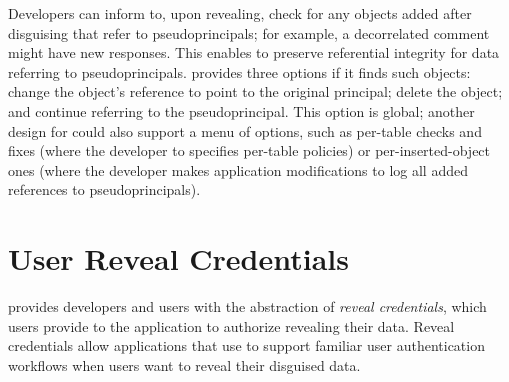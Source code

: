 Developers can inform \sys to, upon revealing, check for any objects
added after disguising that refer to pseudoprincipals; for example, a
decorrelated comment might have new responses. This enables \sys to preserve
referential integrity for data referring to pseudoprincipals. \sys
provides three options if it finds such objects: \one{} change the object's
reference to point to the original principal; \two{} delete the object; and
\three{} continue referring to the pseudoprincipal.
%
This option is global; another design for \sys could also support a menu of
options, such as per-table checks and fixes (where the developer to specifies
per-table policies) or per-inserted-object ones (where the developer makes
application modifications to log all added references to pseudoprincipals).


%
%
%
%
%
%
%
%



\section{User Reveal Credentials}
\sys provides developers and users
with the abstraction of \emph{reveal credentials}, which users provide to the
application to authorize revealing their data.
%
Reveal credentials allow applications that use \sys to support familiar user authentication workflows
when users want to reveal their disguised data. 
%

